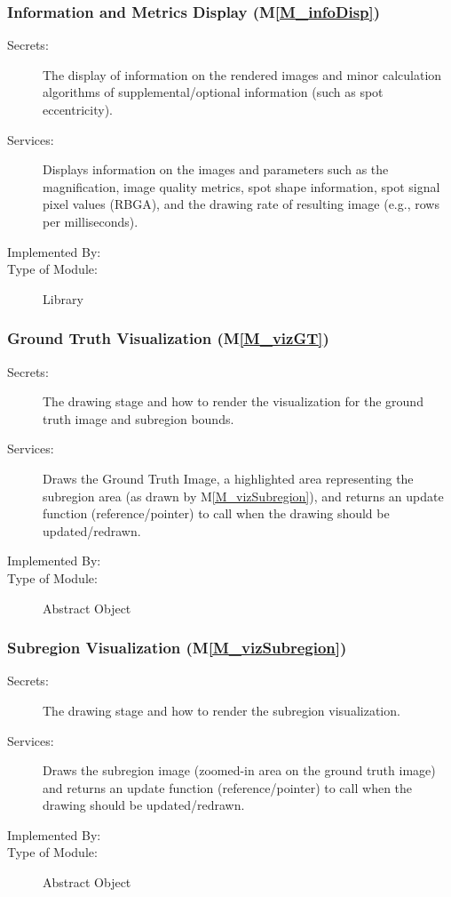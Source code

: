 \documentclass[12pt, titlepage]{article}
\newcommand{\mref}[1]{M\ref{#1}}
\begin{document}
\subsubsection{Information and Metrics Display (\mref{M_infoDisp})}
\begin{description}
\item[Secrets:] The display of information on the rendered
  images and minor calculation algorithms of supplemental/optional information (such as spot eccentricity).
\item[Services:] Displays information on the images and parameters such as the magnification,
  image quality metrics, spot shape information, spot signal pixel values (RBGA),
  and the drawing rate of resulting image (e.g., rows per milliseconds).
\item[Implemented By:] \progname{}
\item[Type of Module:] Library
\end{description}


\subsubsection{Ground Truth Visualization (\mref{M_vizGT})}
\begin{description}
\item[Secrets:] The drawing stage and how to render the visualization for
  the ground truth image and subregion bounds.
\item[Services:] Draws the Ground Truth Image, a highlighted area representing the subregion
  area (as drawn by \mref{M_vizSubregion}), and returns an update function (reference/pointer)
  to call when the drawing should be updated/redrawn.
\item[Implemented By:] \progname{}
\item[Type of Module:] Abstract Object
\end{description}


\subsubsection{Subregion Visualization (\mref{M_vizSubregion})}
\begin{description}
\item[Secrets:] The drawing stage and how to render the subregion visualization.
\item[Services:] Draws the subregion image (zoomed-in area on the ground truth image) 
  and returns an update function (reference/pointer) to call when the drawing should 
  be updated/redrawn.
\item[Implemented By:] \progname{}
\item[Type of Module:] Abstract Object
\end{description}
\end{document}
